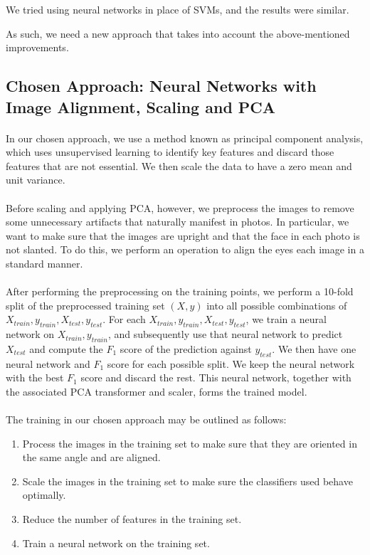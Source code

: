 \documentclass{article}
\begin{document}
We tried using neural networks in place of SVMs, and the results were similar.

As such, we need a new approach that takes into account the above-mentioned improvements.
\newpage

\subsection{Chosen Approach: Neural Networks with Image Alignment, Scaling and PCA}
\label{sec:3.2}
\paragraph{}
In our chosen approach, we use a method known as principal component analysis, which uses unsupervised learning to identify key features and discard those features that are not essential. We then scale the data to have a zero mean and unit variance.

\paragraph{}
Before scaling and applying PCA, however, we preprocess the images to remove some unnecessary artifacts that naturally manifest in photos. In particular, we want to make sure that the images are upright and that the face in each photo is not slanted. To do this, we perform an operation to align the eyes each image in a standard manner.

\paragraph{}
After performing the preprocessing on the training points, we perform a 10-fold split of the preprocessed training set $(X,y)$ into all possible combinations of $X_{train}, y_{train}, X_{test}, y_{test}$. For each $X_{train}, y_{train}, X_{test}, y_{test}$, we train a neural network on $X_{train}, y_{train}$, and subsequently use that neural network to predict $X_{test}$ and compute the $F_1$ score of the prediction against $y_{test}$. We then have one neural network and $F_1$ score for each possible split. We keep the neural network with the best $F_1$ score and discard the rest. This neural network, together with the associated PCA transformer and scaler, forms the trained model.

\paragraph{}
The training in our chosen approach may be outlined as follows:
\begin{enumerate}
	\item Process the images in the training set to make sure that they are oriented in the same angle and are aligned.
	\item Scale the images in the training set to make sure the classifiers used behave optimally.
	\item Reduce the number of features in the training set.
	\item Train a neural network on the training set.
\end{enumerate}
\end{document}
